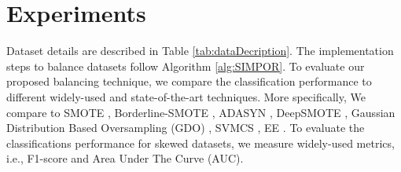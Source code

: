 


\section{Experiments}
\label{sec:experiments}
 Dataset details are described in Table \ref{tab:dataDecription}.  
The implementation steps to balance datasets follow Algorithm \ref{alg:SIMPOR}. To evaluate our proposed balancing technique, we compare the classification performance to different widely-used and state-of-the-art techniques. More specifically, We compare \Methodname{} to SMOTE \cite{chawla_smote:_2002}, Borderline-SMOTE \cite{bordersmote},  ADASYN \cite{ADASYN}, DeepSMOTE \cite{deepsmote}, Gaussian Distribution Based Oversampling (GDO) \cite{bib:GDO}, SVMCS \cite{cssvm}, EE \cite{EE}. To evaluate the classifications performance for skewed datasets, we measure widely-used metrics, i.e., F1-score and Area Under The Curve (AUC). 

